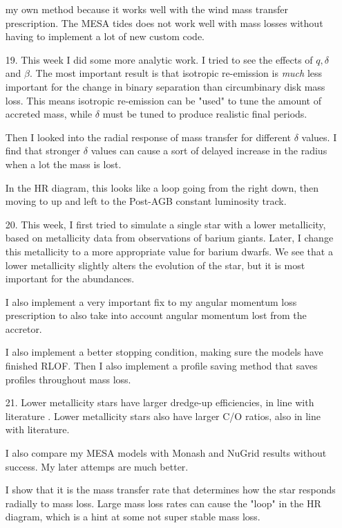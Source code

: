 \documentclass[a4paper,10pt]{article}
\begin{document}
\begin{enumerate}
	      my own method because it works well with the wind mass transfer prescription.
	      The MESA tides does not work well with mass losses without having to implement
	      a lot of new custom code.
	\item[\color{keywordscolor}19.] This week I did some more analytic work.
	      I tried to
	      see the effects of \(q, \delta \) and \(\beta \).
	      The most important result is that isotropic re-emission is \emph{much} less important for the change in binary separation than circumbinary disk mass loss.
	      This means isotropic re-emission can be "used" to tune the amount of accreted mass, while
	      \(\delta \) must be tuned to produce realistic final periods.

	      Then I looked into the radial response of mass transfer for different \(\delta \) values.
	      I find that stronger \(\delta \) values can cause a sort of delayed increase in the radius when a lot the mass is lost.

	      In the HR diagram, this looks like a loop going from the right down, then moving to up and left
	      to the Post-AGB constant luminosity track.
	\item[\color{keywordscolor}20.] This week, I first tried to simulate a single star with a lower metallicity, based on metallicity data from observations of barium giants.
	      Later, I change this metallicity to a more appropriate value for barium dwarfs.
	      We see that a lower metallicity slightly alters the evolution of the star, but it is most important for the abundances.

	      I also implement a very important fix to my angular momentum loss prescription to also take into account angular momentum lost from the accretor.

	      I also implement a better stopping condition, making sure the models have finished RLOF.
	      Then I also implement a profile saving method that saves profiles throughout mass loss.
	\item[\color{keywordscolor}21.] Lower metallicity stars have larger dredge-up efficiencies, in line with literature \citep{herwig2005, karakas1902}.
	      Lower metallicity stars also have larger C/O ratios, also in line with literature.

	      I also compare my MESA models with Monash and NuGrid results without success.
	      My later attemps are much better.

	      I show that it is the mass transfer rate that determines how the star responds radially to mass loss.
	      Large mass loss rates can cause the "loop" in the HR diagram, which is a hint at some not
	      super stable mass loss.


\end{enumerate}
\end{document}
